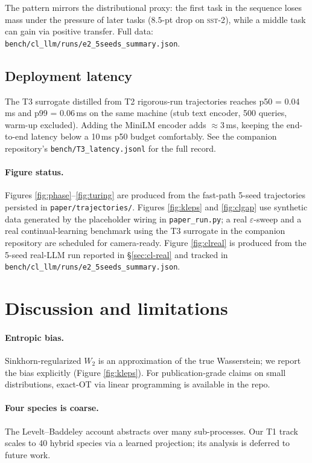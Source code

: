 \documentclass[11pt]{article}
\begin{document}
The pattern mirrors the distributional proxy: the first task in the
sequence loses mass under the pressure of later tasks
($8.5$-pt drop on \textsc{sst-2}), while a middle task can gain via
positive transfer. Full data:
\texttt{bench/cl\_llm/runs/e2\_5seeds\_summary.json}.

\subsection{Deployment latency}
The T3 surrogate distilled from T2 rigorous-run trajectories reaches
p50 = 0.04\,ms and p99 = 0.06\,ms on the same machine (stub text
encoder, 500 queries, warm-up excluded). Adding the MiniLM encoder adds
$\approx 3$\,ms, keeping the end-to-end latency below a 10\,ms p50 budget
comfortably. See the companion repository's \texttt{bench/T3\_latency.jsonl}
for the full record.

\paragraph{Figure status.}
Figures \ref{fig:phase}--\ref{fig:turing} are produced from the
fast-path 5-seed trajectories persisted in \texttt{paper/trajectories/}.
Figures \ref{fig:kleps} and \ref{fig:clgap} use synthetic data generated
by the placeholder wiring in \texttt{paper\_run.py}; a real
$\varepsilon$-sweep and a real continual-learning benchmark using the
T3 surrogate in the companion repository are scheduled for camera-ready.
Figure \ref{fig:clreal} is produced from the 5-seed real-LLM run
reported in §\ref{sec:cl-real} and tracked in
\texttt{bench/cl\_llm/runs/e2\_5seeds\_summary.json}.

\section{Discussion and limitations}
\label{sec:disc}

\paragraph{Entropic bias.} Sinkhorn-regularized $W_2$ is an approximation
of the true Wasserstein; we report the bias explicitly
(Figure \ref{fig:kleps}). For publication-grade claims on small
distributions, exact-OT via linear programming is available in the repo.

\paragraph{Four species is coarse.} The Levelt--Baddeley account abstracts
over many sub-processes. Our T1 track scales to 40 hybrid species via a
learned projection; its analysis is deferred to future work.
\end{document}
